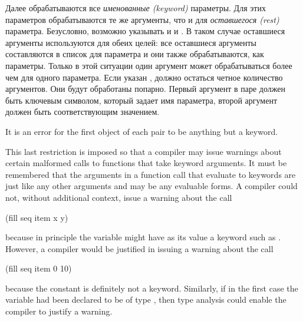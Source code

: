 Далее обрабатываются все \textit{именованные (keyword)} параметры.
Для этих параметров обрабатываются те же аргументы, что и для
\textit{оставшегося (rest)} параметра.
Безусловно, возможно указывать и  и . В таком случае
оставшиеся аргументы используются для обеих целей:
все оставшиеся аргументы составляются в список для  параметра и они
также обрабатываются, как  параметры. Только в этой ситуации один
аргумент может обрабатываться более чем для одного параметра.
Если указан , должно остаться четное количество аргументов. Они будут
обработаны попарно. Первый аргумент в паре должен быть ключевым символом,
который задает имя параметра, второй аргумент должен быть соответствующим
значением.

\begin{obsolete}
It is an error for the first object of each pair to be
anything but a keyword.

\beforenoterule
\begin{rationale}
This last restriction is imposed so that a compiler may
issue warnings about certain malformed calls to functions
that take keyword arguments.  It must be remembered that the
arguments in a function call that evaluate to keywords are just
like any other arguments and may be any evaluable forms.
A compiler could not, without additional context, issue a warning
about the call
\begin{lisp}
(fill seq item x y)
\end{lisp}
because in principle the variable  might have as its value a keyword
such as .  However, a compiler would be justified in issuing
a warning about the call
\begin{lisp}
(fill seq item 0 10)
\end{lisp}
because the constant  is definitely not a keyword.  Similarly,
if in the first case the variable  had been declared to be
of type , then type analysis could enable the compiler
to justify a warning.
\end{rationale}
\afternoterule
\end{obsolete}

